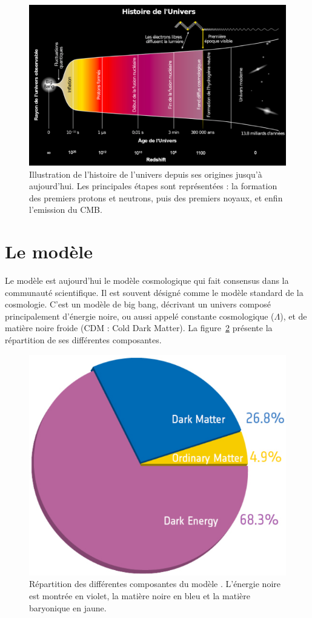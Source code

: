 \documentclass[11pt, twoside, a4paper, openright]{report}
\begin{document}
\begin{figure}
  \centering
  \includegraphics[scale=0.35]{univershistory2}
  \caption{Illustration de l'histoire de l'univers depuis ses origines jusqu'à aujourd'hui. Les principales étapes sont représentées : la formation des premiers protons et neutrons, puis des premiers noyaux, et enfin l'emission du CMB.}
  \label{fig:univershistory}
\end{figure}


\section{Le modèle \lcdm{}}

Le modèle \lcdm{} est aujourd'hui le modèle cosmologique qui fait consensus dans la communauté scientifique. Il est souvent désigné comme le modèle standard de la cosmologie. C'est un modèle de big bang, décrivant un univers composé principalement d'énergie noire, ou aussi appelé constante cosmologique ($\Lambda$), et de matière noire froide (CDM : Cold Dark Matter). La figure~\ref{fig:lcdm} présente la répartition de ses différentes composantes.
\begin{figure}
  \centering
  \includegraphics[scale=0.3]{lcdm}
  \caption{Répartition des différentes composantes du modèle \lcdm{}. L'énergie noire est montrée en violet, la matière noire en bleu et la matière baryonique en jaune.}
  \label{fig:lcdm}
\end{figure}
\end{document}
